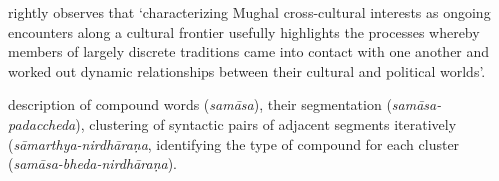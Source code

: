 \textcite[232]{Truschke} rightly observes that `characterizing Mughal cross-cultural interests as ongoing encounters along a cultural frontier usefully highlights the processes whereby members of largely discrete traditions came into contact with one another and worked out dynamic relationships between their cultural and political worlds'.


\newpage
description of compound words (\textit{samāsa}), their segmentation (\textit{samāsa-padaccheda}), clustering of syntactic pairs of adjacent segments iteratively (\textit{sāmarthya-nirdhāraṇa}, identifying the type of compound for each cluster (\textit{samāsa-bheda-nirdhāraṇa}).


